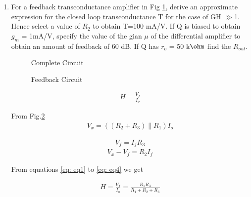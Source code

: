 \begin{enumerate}[label=\arabic*.,ref=\theenumi]


\item For a feedback transconductance amplifier in Fig \ref{fig:fig1}, derive an approximate expression for the closed loop transconductance T for the case of GH $\gg$1. Hence select a value of $R_2$ to obtain T=100 mA/V. If Q is biased to obtain $g_m$ = 1mA/V, specify  the value of the gian $\mu$ of the differential amplifier to obtain an amount of feedback of 60 dB. If Q has $r_o$ = 50 k$\ohm$ find the $R_{out}$.
\begin{figure}[!ht]
	\begin{center}
		\resizebox{\columnwidth}{!}{}
	\end{center}
\caption{Complete Circuit}
\label{fig:fig1}
\end{figure}



\solution


\begin{figure}[!ht]
	\begin{center}
		\resizebox{\columnwidth}{!}{}
	\end{center}
\caption{Feedback Circuit}
\label{fig:fig2}
\end{figure}



\begin{align}
H = \frac{V_f}{I_o}
\label{eq: eq1}
\end{align}

From Fig.\ref{fig:fig2}
\begin{align}
    V_x = ((R_2 + R_3) \| R_1) I_o 
    \label{eq: eq2}
\end{align} 

\begin{align}
V_f = I_f R_3
\label{eq: eq3}
\end{align} 
\begin{align}
V_x - V_f = R_2 I_f
\label{eq: eq4}
\end{align} 

From equations \ref{eq: eq1} to \ref{eq: eq4} we get

\begin{align}
    H = \frac{V_f}{I_o}=\frac{R_1 R_3}{R_1+R_2+R_3}
    \label{eq:eq5}
\end{align}


\end{enumerate}
